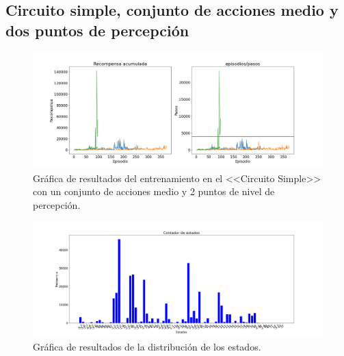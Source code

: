 \subsection{Circuito simple, conjunto de acciones medio y dos puntos de percepción}

\begin{figure}[!ht]
    \centering \includegraphics[width=1\columnwidth]{./figures/anexos/simple_circuit_medium_2.png}
    \caption{Gráfica de resultados del entrenamiento en el <<Circuito Simple>> con un conjunto de acciones medio y 2 puntos de nivel de percepción.}
\end{figure}

\begin{figure}[!ht]
    \centering \includegraphics[width=1\columnwidth]{./figures/anexos/states_counter_simple_circuit_medium_2.png}
    \caption{Gráfica de resultados de la distribución de los estados.}
\end{figure}

